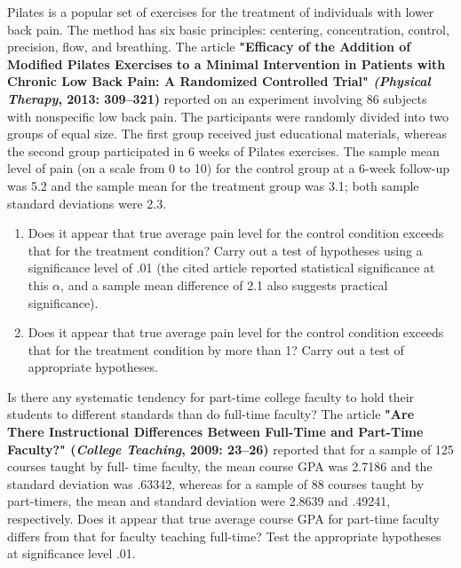 \documentclass[11pt,letterpaper,boxed]{hmcpset}
\begin{document}
{\begin{problem}[9.1.3]
	Pilates is a popular set of exercises for the treatment of individuals with lower back pain. The method has six basic principles: centering, concentration, control, precision, flow, and breathing. The article \textbf{"Efficacy of the Addition of Modified Pilates Exercises to a Minimal Intervention in Patients with Chronic Low Back Pain: A Randomized Controlled Trial" \emph{(Physical Therapy}, 2013: 309--321)} reported on an experiment involving 86 subjects with nonspecific low back pain. The participants were randomly divided into two groups of equal size. The first group received just educational materials, whereas the second group participated in 6 weeks of Pilates exercises. The sample mean level of pain (on a scale from 0 to 10) for the control group at a 6-week follow-up was 5.2 and the sample mean for the treatment group was 3.1; both sample standard deviations were 2.3.
	\begin{enumerate}
		\item
			Does it appear that true average pain level for the control condition exceeds that for the treatment condition? Carry out a test of hypotheses using a significance level of .01 (the cited article reported statistical significance at this $\alpha$, and a sample mean difference of 2.1 also suggests practical significance).
		\item
			Does it appear that true average pain level for the control condition exceeds that for the treatment condition by more than 1? Carry out a test of appropriate hypotheses.
	\end{enumerate}
\end{problem}

\begin{solution}
	\vfill
\end{solution}
\newpage


\begin{problem}[9.1.7]
	Is there any systematic tendency for part-time college faculty to hold their students to different standards than do full-time faculty? The article \textbf{"Are There Instructional Differences Between Full-Time and Part-Time Faculty?" (\emph{College Teaching}, 2009: 23--26)} reported that for a sample of 125 courses taught by full- time faculty, the mean course GPA was 2.7186 and the standard deviation was .63342, whereas for a sample of 88 courses taught by part-timers, the mean and standard deviation were 2.8639 and .49241, respectively. Does it appear that true average course GPA for part-time faculty differs from that for faculty teaching full-time? Test the appropriate hypotheses at significance level .01.
\end{problem}

}
\end{document}
